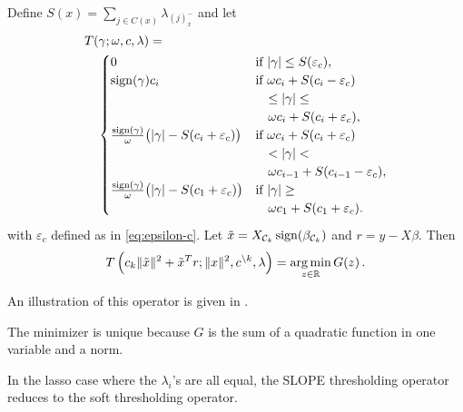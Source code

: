 \begin{theorem}
  \label{thm:thresholding-operator}
  Define \(S(x) = \sum_{j \in C(x)}\lambda_{(j)^-_{x}}\) and
  let
  \[
    \begin{multlined}
      T(\gamma; \omega, c, \lambda) = \\
      \begin{cases}
        0
         & \text{if } |\gamma| \leq S(\varepsilon_c),               \\
        \sign(\gamma)c_i
         & \text{if } \omega c_i + S(c_i - \varepsilon_c)           \\
         & \quad \leq |\gamma| \leq                                 \\
         & \quad \omega c_i + S(c_i + \varepsilon_c),               \\
        \frac{\sign(\gamma)}{\omega} \big( |\gamma| - S(c_i + \varepsilon_c) \big)
         & \text{if } \omega c_i + S(c_i + {\varepsilon_c})         \\
         & \quad < |\gamma| <                                       \\
         & \quad \omega c_{i - 1} + S(c_{i - 1} - {\varepsilon_c}), \\
        \frac{\sign(\gamma)}{\omega} \big( |\gamma| - S(c_1 + {\varepsilon_c}) \big)
         & \text{if } |\gamma| \geq                                 \\
         & \quad \omega c_1 + S(c_1 + {\varepsilon_c}).
      \end{cases}
    \end{multlined}
  \]
  with \({\varepsilon_c}\) defined as in \eqref{eq:epsilon-c}.
  Let $\tilde x = X_{\mathcal{C}_k} \operatorname{sign}(\beta_{\mathcal{C}_k})$
  and \(r = y - X\beta\).
  Then
  \begin{equation}
    \begin{multlined}
      T \left(c_k\norm{\tilde x}^2 + \tilde x^Tr; \norm{x}^2, c^{\setminus k}, \lambda \right) = \argmin_{z \in \mathbb{R}} G(z) \,.
    \end{multlined}
  \end{equation}
\end{theorem}
An illustration of this operator is given in .
\begin{remark}
  The minimizer is unique because \(G\) is the sum of a quadratic function in one variable and a norm.
\end{remark}

\begin{remark}
  In the lasso case where the $\lambda_i$'s are all equal, the SLOPE thresholding operator reduces to the soft thresholding operator.
\end{remark}

